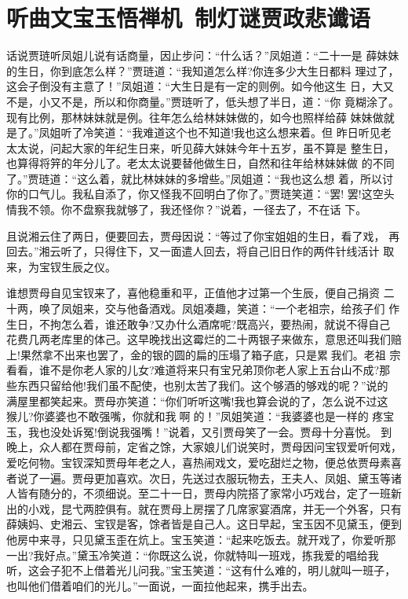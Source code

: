 \chapter{听曲文宝玉悟禅机~制灯谜贾政悲谶语}

话说贾琏听凤姐儿说有话商量，因止步问：“什么话？”凤姐道：“二十一是
薛妹妹的生日，你到底怎么样？”贾琏道：“我知道怎么样?你连多少大生日都料
理过了，这会子倒没有主意了！”凤姐道：“大生日是有一定的则例。如今他这生
日，大又不是，小又不是，所以和你商量。”贾琏听了，低头想了半日，道：“你
竟糊涂了。现有比例，那林妹妹就是例。往年怎么给林妹妹做的，如今也照样给薛
妹妹做就是了。”凤姐听了冷笑道：“我难道这个也不知道!我也这么想来着。但
昨日听见老太太说，问起大家的年纪生日来，听见薛大妹妹今年十五岁，虽不算是
整生日，也算得将笄的年分儿了。老太太说要替他做生日，自然和往年给林妹妹做
的不同了。”贾琏道：“这么着，就比林妹妹的多增些。”凤姐道：“我也这么想
着，所以讨你的口气儿。我私自添了，你又怪我不回明白了你了。”贾琏笑道：“罢!
罢!这空头情我不领。你不盘察我就够了，我还怪你？”说着，一径去了，不在话
下。

且说湘云住了两日，便要回去，贾母因说：“等过了你宝姐姐的生日，看了戏，
再回去。”湘云听了，只得住下，又一面遣人回去，将自己旧日作的两件针线活计
取来，为宝钗生辰之仪。

谁想贾母自见宝钗来了，喜他稳重和平，正值他才过第一个生辰，便自己捐资
二十两，唤了凤姐来，交与他备酒戏。凤姐凑趣，笑道：“一个老祖宗，给孩子们
作生日，不拘怎么着，谁还敢争?又办什么酒席呢?既高兴，要热闹，就说不得自己
花费几两老库里的体己。这早晚找出这霉烂的二十两银子来做东，意思还叫我们赔
上!果然拿不出来也罢了，金的银的圆的扁的压塌了箱子底，只是累我们。老祖
宗看看，谁不是你老人家的儿女?难道将来只有宝兄弟顶你老人家上五台山不成?那
些东西只留给他!我们虽不配使，也别太苦了我们。这个够酒的够戏的呢？”说的
满屋里都笑起来。贾母亦笑道：“你们听听这嘴!我也算会说的了，怎么说不过这
猴儿?你婆婆也不敢强嘴，你就和我啊的！”凤姐笑道：“我婆婆也是一样的
疼宝玉，我也没处诉冤!倒说我强嘴！”说着，又引贾母笑了一会。贾母十分喜悦。
到晚上，众人都在贾母前，定省之馀，大家娘儿们说笑时，贾母因问宝钗爱听何戏，
爱吃何物。宝钗深知贾母年老之人，喜热闹戏文，爱吃甜烂之物，便总依贾母素喜
者说了一遍。贾母更加喜欢。次日，先送过衣服玩物去，王夫人、凤姐、黛玉等诸
人皆有随分的，不须细说。至二十一日，贾母内院搭了家常小巧戏台，定了一班新
出的小戏，昆弋两腔俱有。就在贾母上房摆了几席家宴酒席，并无一个外客，只有
薛姨妈、史湘云、宝钗是客，馀者皆是自己人。这日早起，宝玉因不见黛玉，便到
他房中来寻，只见黛玉歪在炕上。宝玉笑道：“起来吃饭去。就开戏了，你爱听那
一出?我好点。”黛玉冷笑道：“你既这么说，你就特叫一班戏，拣我爱的唱给我
听，这会子犯不上借着光儿问我。”宝玉笑道：“这有什么难的，明儿就叫一班子，
也叫他们借着咱们的光儿。”一面说，一面拉他起来，携手出去。


